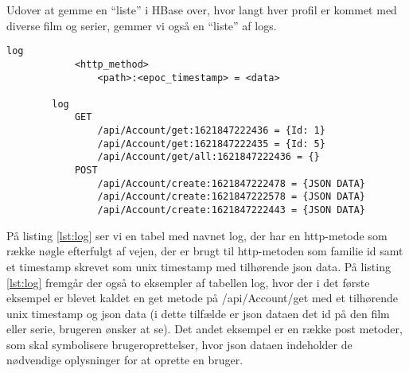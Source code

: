Udover at gemme en “liste” i HBase over, hvor langt hver profil er kommet med diverse film og serier, gemmer vi også en “liste” af logs.
\begin{tcolorbox}
    \lstset{style=htmlstyle}
    \begin{lstlisting}[language={[Sharp]C}, caption={Logs HBASE Model}, label={lst:log}]
        log
            <http_method>
                <path>:<epoc_timestamp> = <data>
    
        log
            GET
                /api/Account/get:1621847222436 = {Id: 1}
                /api/Account/get:1621847222435 = {Id: 5}
                /api/Account/get/all:1621847222436 = {}
            POST
                /api/Account/create:1621847222478 = {JSON DATA}
                /api/Account/create:1621847222578 = {JSON DATA}
                /api/Account/create:1621847222443 = {JSON DATA}
    \end{lstlisting}
\end{tcolorbox}
På listing \ref{lst:log} ser vi en tabel med navnet log, der har en http-metode som række nøgle efterfulgt af vejen, der er brugt til http-metoden som familie id samt et timestamp skrevet som unix timestamp med tilhørende json data. På listing \ref{lst:log} fremgår der også to eksempler af tabellen log, hvor der i det første eksempel er blevet kaldet en get metode på /api/Account/get med et tilhørende unix timestamp og json data (i dette tilfælde er json dataen det id på den film eller serie, brugeren ønsker at se). Det andet eksempel er en række post metoder, som skal symbolisere brugeroprettelser, hvor json dataen indeholder de nødvendige oplysninger for at oprette en bruger.